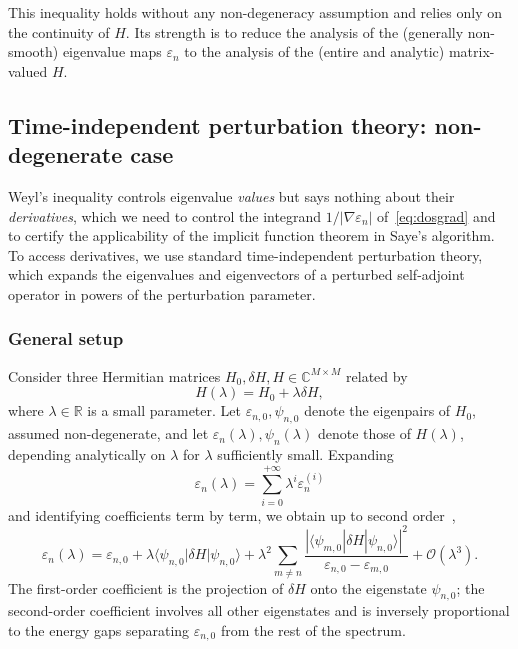\documentclass[11pt]{article}
\numberwithin{equation}{section}
\begin{document}
This inequality holds without any non-degeneracy assumption and relies only on the
continuity of \(H\). Its strength is to reduce the analysis of the (generally non-smooth)
eigenvalue maps \(\varepsilon_n\) to the analysis of the (entire and analytic)
matrix-valued \(H\).

\subsection{Time-independent perturbation theory: non-degenerate
    case}\label{sec:perturbation-nondegen}

Weyl's inequality controls eigenvalue \emph{values} but says nothing about their
\emph{derivatives}, which we need to control the integrand \(1/|\nabla \varepsilon_n|\)
of~\eqref{eq:dosgrad} and to certify the applicability of the implicit function theorem in
Saye's algorithm. To access derivatives, we use standard time-independent perturbation
theory, which expands the eigenvalues and eigenvectors of a perturbed self-adjoint
operator in powers of the perturbation parameter.

\subsubsection{General setup}

Consider three Hermitian matrices \(H_0, \delta H, H \in \mathbb{C}^{M\times M}\) related
by
\begin{equation}
    H(\lambda) = H_0 + \lambda\delta H,
\end{equation}
where \(\lambda \in \mathbb{R}\) is a small parameter. Let \(\varepsilon_{n,0},
\psi_{n,0}\) denote the eigenpairs of \(H_0\), assumed non-degenerate, and let
\(\varepsilon_n(\lambda), \psi_n(\lambda)\) denote those of \(H(\lambda)\), depending
analytically on \(\lambda\) for \(\lambda\) sufficiently small. Expanding
\begin{equation}
    \varepsilon_n(\lambda) = \sum_{i=0}^{+\infty} \lambda^i\varepsilon_n^{(i)}
\end{equation}
and identifying coefficients term by term, we obtain up to second
order~\cite{kato1995perturbation},
\begin{equation}
    \varepsilon_n(\lambda)
    = \varepsilon_{n,0}
    + \lambda\langle \psi_{n,0} | \delta H | \psi_{n,0} \rangle
    + \lambda^2 \sum_{m \neq n}
    \frac{|\langle \psi_{m,0} | \delta H | \psi_{n,0} \rangle|^2}
    {\varepsilon_{n,0} - \varepsilon_{m,0}}
    + \mathcal{O}(\lambda^3).
    \label{eq:rsbg}
\end{equation}
The first-order coefficient is the projection of \(\delta H\) onto the eigenstate
\(\psi_{n,0}\); the second-order coefficient involves all other eigenstates and is
inversely proportional to the energy gaps separating \(\varepsilon_{n,0}\) from the rest
of the spectrum.
\end{document}
